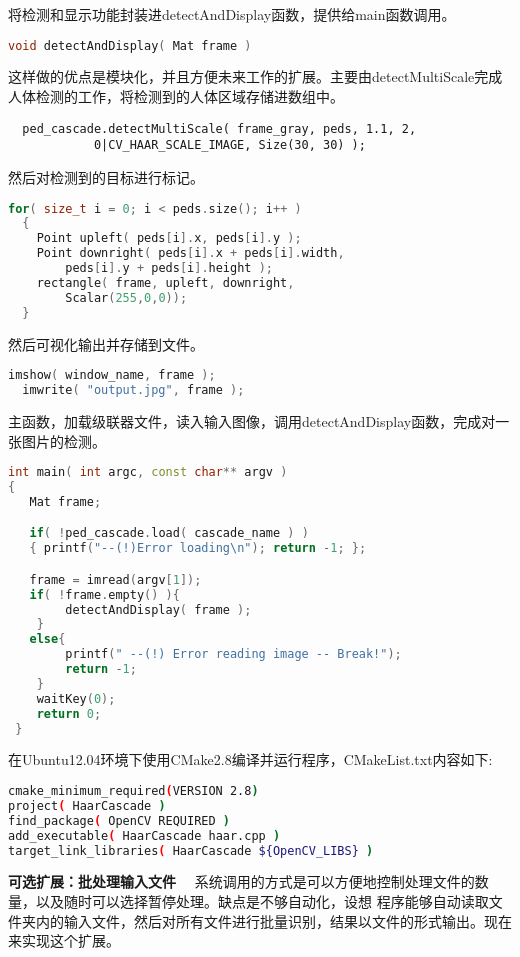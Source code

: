 将检测和显示功能封装进\textsf{detectAndDisplay}函数，提供给\textsf{main}函数调用。
\begin{lstlisting}[language=C++]
void detectAndDisplay( Mat frame )
\end{lstlisting}

这样做的优点是模块化，并且方便未来工作的扩展。主要由\textsf{detectMultiScale}完成
人体检测的工作，将检测到的人体区域存储进数组中。
\begin{lstlisting}
  ped_cascade.detectMultiScale( frame_gray, peds, 1.1, 2,
  			0|CV_HAAR_SCALE_IMAGE, Size(30, 30) );
\end{lstlisting}

然后对检测到的目标进行标记。
\begin{lstlisting}[language=C++]
  for( size_t i = 0; i < peds.size(); i++ )
  {
    Point upleft( peds[i].x, peds[i].y );
    Point downright( peds[i].x + peds[i].width,
		peds[i].y + peds[i].height );
    rectangle( frame, upleft, downright,
		Scalar(255,0,0));
  }
\end{lstlisting}

然后可视化输出并存储到文件。
\begin{lstlisting}[language=C++]
  imshow( window_name, frame );
  imwrite( "output.jpg", frame );
\end{lstlisting}


主函数，加载级联器文件，读入输入图像，调用\textsf{detectAndDisplay}函数，完成对一张图片的检测。
\begin{lstlisting}[language=C++]
int main( int argc, const char** argv )
{
   Mat frame;

   if( !ped_cascade.load( cascade_name ) )
   { printf("--(!)Error loading\n"); return -1; };

   frame = imread(argv[1]);
   if( !frame.empty() ){
		detectAndDisplay( frame );
	}
   else{
		printf(" --(!) Error reading image -- Break!");
		return -1;
	}
	waitKey(0);
    return 0;
 }
\end{lstlisting}

在Ubuntu12.04环境下使用CMake2.8编译并运行程序，CMakeList.txt内容如下:
\begin{lstlisting}[language=bash]
cmake_minimum_required(VERSION 2.8)
project( HaarCascade )
find_package( OpenCV REQUIRED )
add_executable( HaarCascade haar.cpp )
target_link_libraries( HaarCascade ${OpenCV_LIBS} )
\end{lstlisting}

\textbf{可选扩展：批处理输入文件}~~
系统调用的方式是可以方便地控制处理文件的数量，以及随时可以选择暂停处理。缺点是不够自动化，设想
程序能够自动读取文件夹内的输入文件，然后对所有文件进行批量识别，结果以文件的形式输出。现在
来实现这个扩展。

